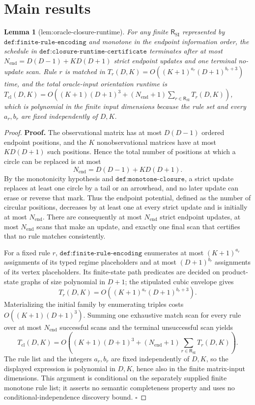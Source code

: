 \documentclass{article}
\newtheorem{lemma}{Lemma}
\begin{document}
\section{Main results}

\begin{lemma}[lem:oracle-closure-runtime]\label{lem:oracle-closure-runtime}
For any finite \(\mathsf R_{\mathrm{SI}}\) represented by \(\texttt{def:finite-rule-encoding}\) and monotone in the endpoint information order, the schedule in \(\texttt{def:closure-runtime-certificate}\) terminates after at most \(N_{\mathrm{end}}=D(D-1)+KD(D+1)\) strict endpoint updates and one terminal no-update scan. Rule \(r\) is matched in \(T_r(D,K)=O((K+1)^{a_r}(D+1)^{b_r+3})\) time, and the total oracle-input orientation runtime is \(T_{\mathrm{cl}}(D,K)=O((K+1)(D+1)^3+(N_{\mathrm{end}}+1)\sum_{r\in\mathsf R_{\mathrm{SI}}}T_r(D,K))\), which is polynomial in the finite input dimensions because the rule set and every \(a_r,b_r\) are fixed independently of \(D,K\).
\end{lemma}
\begin{proof}
\textbf{Proof.}
The observational matrix has at most \(D(D-1)\) ordered endpoint positions, and the \(K\) nonobservational matrices have at most \(KD(D+1)\) such positions.  Hence the total number of positions at which a circle can be replaced is at most
\[
N_{\mathrm{end}}=D(D-1)+KD(D+1).
\]
By the monotonicity hypothesis and \(\texttt{def:monotone-closure}\), a strict update replaces at least one circle by a tail or an arrowhead, and no later update can erase or reverse that mark.  Thus the endpoint potential, defined as the number of circular positions, decreases by at least one at every strict update and is initially at most \(N_{\mathrm{end}}\).  There are consequently at most \(N_{\mathrm{end}}\) strict endpoint updates, at most \(N_{\mathrm{end}}\) scans that make an update, and exactly one final scan that certifies that no rule matches consistently.

For a fixed rule \(r\), \(\texttt{def:finite-rule-encoding}\) enumerates at most \((K+1)^{a_r}\) assignments of its typed regime placeholders and at most \((D+1)^{b_r}\) assignments of its vertex placeholders.  Its finite-state path predicates are decided on product-state graphs of size polynomial in \(D+1\); the stipulated cubic envelope gives
\[
T_r(D,K)=O\!\left((K+1)^{a_r}(D+1)^{b_r+3}\right).
\]
Materializing the initial family by enumerating triples costs \(O((K+1)(D+1)^3)\).  Summing one exhaustive match scan for every rule over at most \(N_{\mathrm{end}}\) successful scans and the terminal unsuccessful scan yields
\[
T_{\mathrm{cl}}(D,K)
=O\!\left((K+1)(D+1)^3
+(N_{\mathrm{end}}+1)\sum_{r\in\mathsf R_{\mathrm{SI}}}T_r(D,K)\right).
\]
The rule list and the integers \(a_r,b_r\) are fixed independently of \(D,K\), so the displayed expression is polynomial in \(D,K\), hence also in the finite matrix-input dimensions.  This argument is conditional on the separately supplied finite monotone rule list; it asserts no semantic completeness property and uses no conditional-independence discovery bound. \(\square\)
\end{proof}
\end{document}
